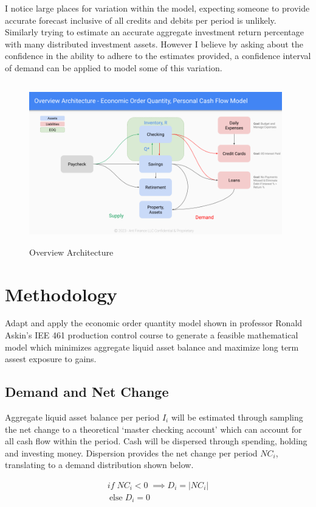 \documentclass{article}
\begin{document}
I notice large places for variation within the model, expecting someone to provide accurate forecast inclusive of all credits and debits per period is unlikely. Similarly trying to estimate an accurate aggregate investment return percentage with many distributed investment assets. However I believe by asking about the confidence in the ability to adhere to the estimates provided, a confidence interval of demand can be applied to model some of this variation.  

\begin{figure}
	\centering
	\includegraphics[width=11cm, height=7cm]{EOQ Personal Cash Flow Model}
	\caption{Overview Architecture}
	\label{fig:fig1}
\end{figure}
\FloatBarrier

\section{Methodology}
Adapt and apply the economic order quantity model shown in professor Ronald Askin’s IEE 461 \cite{Askin2019} production control course to generate a feasible mathematical model which minimizes aggregate liquid asset balance and maximize long term assest exposure to gains. 

\subsection{Demand and Net Change}
Aggregate liquid asset balance per period  $I_{i}$ will be estimated through sampling the net change to a theoretical ‘master checking account’ which can account for all cash flow within the period. Cash will be dispersed through spending, holding and investing money. Dispersion provides the net change per period $NC_{i}$, translating to a demand distribution shown below.

\begin{equation}
	\begin{split}
		if \; NC_{i} < 0 \;\implies D_{i} = |NC_{i}| \\
	  	\:\text{else}\; D_{i} = 0
	\end{split}
\end{equation}
 
\end{document}
